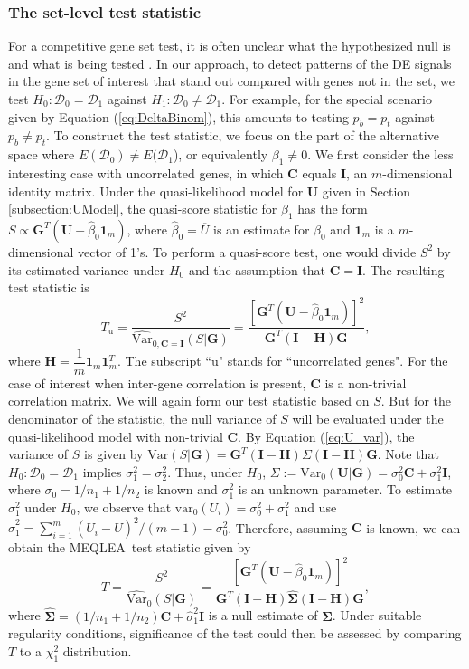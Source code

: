 \documentclass[a4,center,fleqn]{NAR}
\newcommand{\OurMethod}{MEQLEA}
\begin{document}
	\subsubsection{The set-level test statistic}\label{subsection:MEQL}
	For a competitive gene set test, it is often unclear what the hypothesized null is and what is
	being tested \citep{barry2008statistical,wu2012camera}. In our approach, to detect patterns of the
	DE signals in the gene set of interest that stand out compared with genes not in the set, we test
	$H_0: \mathscr{D}_0=\mathscr{D}_1$ against $H_1: \mathscr{D}_0\ne\mathscr{D}_1$. For example, for
	the special scenario given by Equation (\ref{eq:DeltaBinom}), this amounts to testing $p_{b}=p_{t}$
	against $p_{b}\ne p_{t}$.
	To construct the test statistic, we focus on the part of the alternative space where
	$E(\mathscr{D}_0)\ne E(\mathscr{D}_1$), or equivalently $\beta_1\ne 0$. We first consider the less
	interesting case with uncorrelated genes, in which $\bm C$ equals $\bm I$, an $m$-dimensional
	identity matrix. Under the quasi-likelihood model for $\bm U$ given in Section
	\ref{subsection:UModel},  the quasi-score statistic for $\beta_1$ has the form $S \propto \bm
	G^T(\bm U-\hat\beta_0\bm 1_m)$, where $\hat\beta_0=\overline{U}$ is an estimate for $\beta_0$ and
	$\bm 1_m$ is a $m$-dimensional vector of 1's. To perform a quasi-score test, one would divide $S^2$
	by its estimated variance under $H_0$ and the assumption that $\bm C=\bm I$. The resulting test
	statistic is 
	\begin{equation}
	T_{\text{u}} = \dfrac{S^2}{\widehat{\mbox{Var}}_{0, \bm C=\bm I}(S|\bm G)} = \dfrac{[\bm G^T(\bm
		U-\hat\beta_0\bm 1_m)]^2}{\bm G^T(\bm I-\bm H)\bm G}, 
	\end{equation}
	where $\bm H = \dfrac{1}{m}\bm 1_m\bm 1_m^T$. The subscript ``u" stands for ``uncorrelated genes".
	For the case of interest when inter-gene correlation is present, $\bm C$ is a non-trivial
	correlation matrix. We will again form our test statistic based on $S$. But for the
	denominator of the statistic, the null variance of $S$ will be evaluated under the quasi-likelihood
	model with non-trivial $\bm C$. By Equation (\ref{eq:U_var}), the variance of $S$ is given by
	$\mbox{Var}(S|\bm G) = \bm G^T(\bm I-\bm H)\Sigma(\bm I-\bm H)\bm G$. Note that $H_0:
	\mathscr{D}_0=\mathscr{D}_1$ implies $\sigma_1^2=\sigma_2^2$. Thus, under $H_0$,
	$\Sigma:=\mbox{Var}_{0}(\bm U|\bm G)=\sigma_0^2\bm C+\sigma_1^2\bm I$, where $\sigma_0=1/n_1+1/n_2$
	is known and $\sigma_1^2$ is an unknown parameter. To estimate $\sigma_1^2$ under $H_0$, we observe
	that $\mbox{var}_{0}(U_i)=\sigma_0^2+\sigma_1^2$ and use
	$\hat\sigma_1^2=\sum_{i=1}^m(U_i-\overline{U})^2/(m-1)-\sigma_0^2$. Therefore, assuming $\bm C$ is
	known, we can obtain the \OurMethod~test statistic given by
	\begin{equation}
	T = \dfrac{S^2}{\widehat{\mbox{Var}}_{0}(S|\bm G)} = \dfrac{[\bm G^T(\bm U-\hat\beta_0\bm
		1_m)]^2}{\bm G^T(\bm I-\bm H)\hat{\bm\Sigma}(\bm I-\bm H)\bm G}, 
	\end{equation}
	where $\hat{\bm\Sigma}=(1/n_1+1/n_2)\bm C+\hat\sigma_1^2\bm I$ is a null estimate of $\bm \Sigma$.
	Under suitable regularity conditions, significance of the test could then be assessed by comparing
	$T$ to a $\chi^2_1$ distribution.
	
\end{document}
